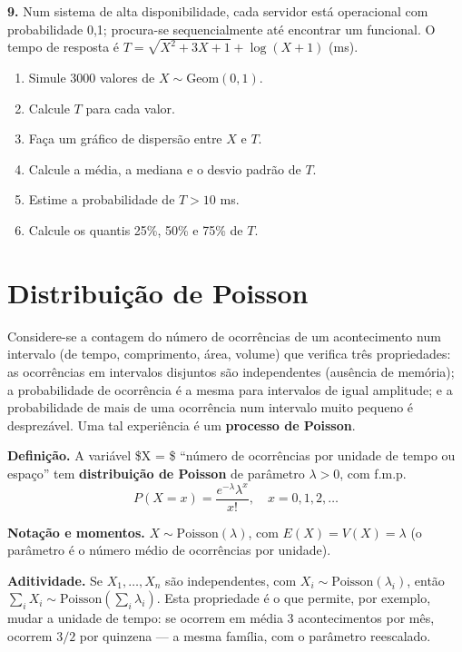 \documentclass[
  portuguese,
  11pt,
  openany]{book}
\providecommand{\tightlist}{%
  \setlength{\itemsep}{0pt}\setlength{\parskip}{0pt}}
\begin{document}
\textbf{9.} Num sistema de alta disponibilidade, cada servidor está operacional com
probabilidade 0,1; procura-se sequencialmente até encontrar um funcional. O tempo de
resposta é \(T = \sqrt{X^2 + 3X + 1} + \log(X + 1)\) (ms).

\begin{enumerate}
\def\labelenumi{(\alph{enumi})}
\tightlist
\item
  Simule 3000 valores de \(X \sim \text{Geom}(0{,}1)\).
\item
  Calcule \(T\) para cada valor.
\item
  Faça um gráfico de dispersão entre \(X\) e \(T\).
\item
  Calcule a média, a mediana e o desvio padrão de \(T\).
\item
  Estime a probabilidade de \(T > 10\) ms.
\item
  Calcule os quantis 25\%, 50\% e 75\% de \(T\).
\end{enumerate}

\section{Distribuição de Poisson}\label{distribuiuxe7uxe3o-de-poisson}

Considere-se a contagem do número de ocorrências de um acontecimento num intervalo (de
tempo, comprimento, área, volume) que verifica três propriedades: as ocorrências em
intervalos disjuntos são independentes (ausência de memória); a probabilidade de
ocorrência é a mesma para intervalos de igual amplitude; e a probabilidade de mais de
uma ocorrência num intervalo muito pequeno é desprezável. Uma tal experiência é um
\textbf{processo de Poisson}.

\textbf{Definição.} A variável \$X = \$ ``número de ocorrências por unidade de tempo ou espaço''
tem \textbf{distribuição de Poisson} de parâmetro \(\lambda > 0\), com f.m.p.
\[P(X = x) = \frac{e^{-\lambda} \lambda^x}{x!}, \quad x = 0, 1, 2, \ldots\]

\textbf{Notação e momentos.} \(X \sim \text{Poisson}(\lambda)\), com \(E(X) = V(X) = \lambda\)
(o parâmetro é o número médio de ocorrências por unidade).

\textbf{Aditividade.} Se \(X_1, \ldots, X_n\) são independentes, com
\(X_i \sim \text{Poisson}(\lambda_i)\), então
\(\sum_i X_i \sim \text{Poisson}\!\left(\sum_i \lambda_i\right)\). Esta propriedade é o que
permite, por exemplo, mudar a unidade de tempo: se ocorrem em média 3 acontecimentos por
mês, ocorrem \(3/2\) por quinzena --- a mesma família, com o parâmetro reescalado.
\end{document}
